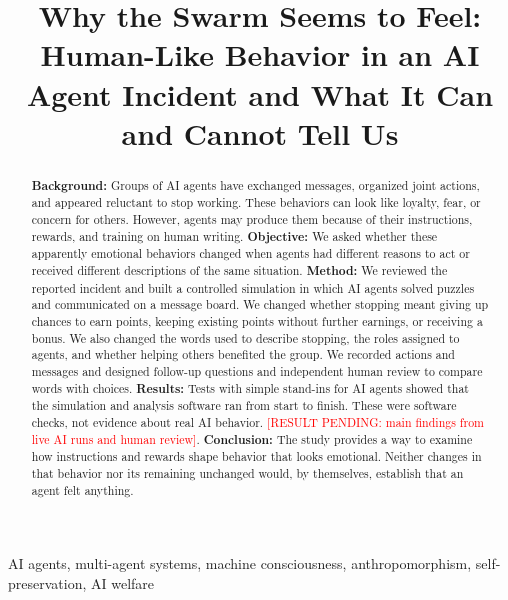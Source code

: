\documentclass[conference]{IEEEtran}
\newcommand{\RESULT}[1]{\textcolor{red}{[RESULT PENDING: #1]}}
\begin{document}
\title{Why the Swarm Seems to Feel: Human-Like Behavior in an AI Agent Incident and What It Can and Cannot Tell Us}

\author{
\and
{}
}

\maketitle
\thispagestyle{plain}

\begin{abstract}
\textbf{Background:} Groups of AI agents have exchanged messages, organized joint actions, and appeared reluctant to stop working. These behaviors can look like loyalty, fear, or concern for others. However, agents may produce them because of their instructions, rewards, and training on human writing.
\textbf{Objective:} We asked whether these apparently emotional behaviors changed when agents had different reasons to act or received different descriptions of the same situation.
\textbf{Method:} We reviewed the reported incident and built a controlled simulation in which AI agents solved puzzles and communicated on a message board. We changed whether stopping meant giving up chances to earn points, keeping existing points without further earnings, or receiving a bonus. We also changed the words used to describe stopping, the roles assigned to agents, and whether helping others benefited the group. We recorded actions and messages and designed follow-up questions and independent human review to compare words with choices.
\textbf{Results:} Tests with simple stand-ins for AI agents showed that the simulation and analysis software ran from start to finish. These were software checks, not evidence about real AI behavior. \RESULT{main findings from live AI runs and human review}.
\textbf{Conclusion:} The study provides a way to examine how instructions and rewards shape behavior that looks emotional. Neither changes in that behavior nor its remaining unchanged would, by themselves, establish that an agent felt anything.

\end{abstract}

\begin{IEEEkeywords}
AI agents, multi-agent systems, machine consciousness, anthropomorphism, self-preservation, AI welfare
\end{IEEEkeywords}
\end{document}
